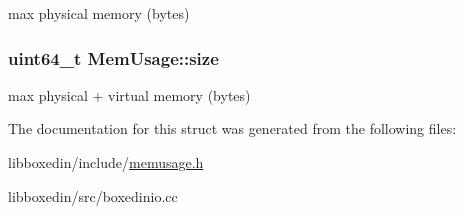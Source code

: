 max physical memory (bytes) \hypertarget{structMemUsage_aea96a2509e52b4b27806869d425b6255}{
\subsubsection[{size}]{\setlength{\rightskip}{0pt plus 5cm}uint64\+\_\+t Mem\+Usage\+::size}}\label{structMemUsage_aea96a2509e52b4b27806869d425b6255}
max physical + virtual memory (bytes) 

The documentation for this struct was generated from the following files\+:\begin{DoxyCompactItemize}
\item 
libboxedin/include/\hyperlink{memusage_8h}{memusage.\+h}\item 
libboxedin/src/boxedinio.\+cc\end{DoxyCompactItemize}
